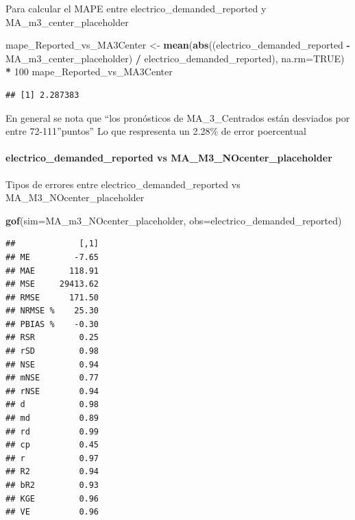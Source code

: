 \documentclass[
]{article}
\newenvironment{Shaded}{\begin{snugshade}}{\end{snugshade}}
\newcommand{\AttributeTok}[1]{\textcolor[rgb]{0.13,0.29,0.53}{#1}}
\newcommand{\ConstantTok}[1]{\textcolor[rgb]{0.56,0.35,0.01}{#1}}
\newcommand{\DecValTok}[1]{\textcolor[rgb]{0.00,0.00,0.81}{#1}}
\newcommand{\FunctionTok}[1]{\textcolor[rgb]{0.13,0.29,0.53}{\textbf{#1}}}
\newcommand{\NormalTok}[1]{#1}
\newcommand{\OtherTok}[1]{\textcolor[rgb]{0.56,0.35,0.01}{#1}}
\newcommand{\SpecialCharTok}[1]{\textcolor[rgb]{0.81,0.36,0.00}{\textbf{#1}}}
\begin{document}
Para calcular el MAPE entre electrico\_demanded\_reported y
MA\_m3\_center\_placeholder

\begin{Shaded}
\begin{Highlighting}[]
\NormalTok{mape\_Reported\_vs\_MA3Center }\OtherTok{\textless{}{-}} \FunctionTok{mean}\NormalTok{(}\FunctionTok{abs}\NormalTok{((electrico\_demanded\_reported }\SpecialCharTok{{-}}\NormalTok{ MA\_m3\_center\_placeholder) }\SpecialCharTok{/}\NormalTok{ electrico\_demanded\_reported), }\AttributeTok{na.rm=}\ConstantTok{TRUE}\NormalTok{) }\SpecialCharTok{*} \DecValTok{100}
\NormalTok{mape\_Reported\_vs\_MA3Center}
\end{Highlighting}
\end{Shaded}

\begin{verbatim}
## [1] 2.287383
\end{verbatim}

En general se nota que ``los pronósticos de MA\_3\_Centrados están
desviados por entre 72-111''puntos'' Lo que respresenta un 2.28\% de
error poercentual

\hypertarget{electrico_demanded_reported-vs-ma_m3_nocenter_placeholder}{%
\paragraph{electrico\_demanded\_reported vs
MA\_M3\_NOcenter\_placeholder}\label{electrico_demanded_reported-vs-ma_m3_nocenter_placeholder}}

Tipos de errores entre electrico\_demanded\_reported vs
MA\_M3\_NOcenter\_placeholder

\begin{Shaded}
\begin{Highlighting}[]
\FunctionTok{gof}\NormalTok{(}\AttributeTok{sim=}\NormalTok{MA\_m3\_NOcenter\_placeholder, }\AttributeTok{obs=}\NormalTok{electrico\_demanded\_reported)}
\end{Highlighting}
\end{Shaded}

\begin{verbatim}
##             [,1]
## ME         -7.65
## MAE       118.91
## MSE     29413.62
## RMSE      171.50
## NRMSE %    25.30
## PBIAS %    -0.30
## RSR         0.25
## rSD         0.98
## NSE         0.94
## mNSE        0.77
## rNSE        0.94
## d           0.98
## md          0.89
## rd          0.99
## cp          0.45
## r           0.97
## R2          0.94
## bR2         0.93
## KGE         0.96
## VE          0.96
\end{verbatim}
\end{document}

